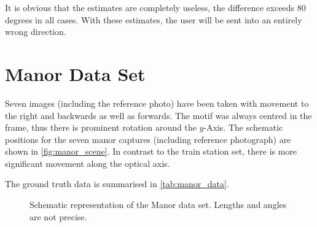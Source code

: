 It is obvious that the estimates are completely useless, the difference exceeds
$80$ degrees in all cases. With these estimates, the user will be sent into an
entirely wrong direction.

\FloatBarrier

\section{Manor Data Set}

Seven images (including the reference photo) have been taken with movement to
the right and backwards as well as forwards. The motif was always centred in the
frame, thus there is prominent rotation around the $y$-Axis. 
The schematic positions for the seven manor captures (including reference
photograph) are shown in \autoref{fig:manor_scene}. In contrast to the
train station set, there is more significant movement along the optical axis.

The ground truth data is summarised in \autoref{tab:manor_data}.

\begin{figure}
   {\centering      
      
      \caption[Schematic of the manor data set]{Schematic representation of the Manor data set. Lengths and angles are not
      precise.}
   \label{fig:manor_scene}}
\end{figure}



